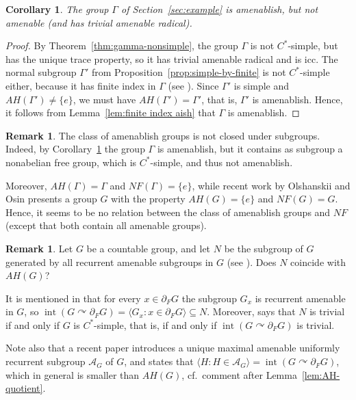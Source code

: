 \documentclass[a4paper]{amsart}
\theoremstyle{plain}
\newtheorem{corollary}[theorem]{Corollary}
\theoremstyle{definition}
\newtheorem{remark}[theorem]{Remark}
\theoremstyle{remark}
\numberwithin{theorem}{section}
\begin{document}
\begin{corollary}\label{cor:gamma-amenablish}
The group $\Gamma$ of Section~\ref{sec:example} is amenablish, but not amenable (and has trivial amenable radical).
\end{corollary}

\begin{proof}
By Theorem~\ref{thm:gamma-nonsimple}, the group $\Gamma$ is not $C^*$-simple, but has the unique trace property,
so it has trivial amenable radical and is icc.
The normal subgroup $\Gamma'$ from Proposition~\ref{prop:simple-by-finite} is not $C^*$-simple either,
because it has finite index in $\Gamma$ (see \cite[Proposition~19~(iv)]{Harpe2}).
Since $\Gamma'$ is simple and $AH(\Gamma')\neq\{e\}$, we must have $AH(\Gamma')=\Gamma'$, that is, $\Gamma'$ is amenablish.
Hence, it follows from Lemma~\ref{lem:finite index aish} that $\Gamma$ is amenablish.
\end{proof}

\begin{remark}
The class of amenablish groups is not closed under subgroups.
Indeed, by Corollary~\ref{cor:gamma-amenablish} the group $\Gamma$ is amenablish,
but it contains as subgroup a nonabelian free group, which is $C^*$-simple, and thus not amenablish.

Moreover, $AH(\Gamma)=\Gamma$ and $NF(\Gamma)=\{e\}$,
while recent work by Olshanskii and Osin \cite{O-O} presents a group $G$ with the property $AH(G)=\{e\}$ and $NF(G)=G$.
Hence, it seems to be no relation between the class of amenablish groups and $NF$ (except that both contain all amenable groups).
\end{remark}

\begin{remark}\label{AG}
Let $G$ be a countable group, and let $N$ be the subgroup of $G$ generated by all recurrent amenable subgroups in $G$ (see \cite[Definition~5.1]{Kennedy}). Does $N$ coincide with $AH(G)$?

It is mentioned in \cite[Remark~5.4]{Kennedy} that for every $x\in\partial_F G$ the subgroup $G_x$ is recurrent amenable in $G$,
so $\operatorname{int}(G\curvearrowright\partial_F G)=\langle G_x : x\in\partial_F G\rangle\subseteq N$.
Moreover, \cite[Theorem~1.1]{Kennedy} says that $N$ is trivial if and only if $G$ is $C^*$-simple,
that is, if and only if $\operatorname{int}(G\curvearrowright\partial_F G)$ is trivial.

Note also that a recent paper \cite[Section~4]{Boudec-Bon} introduces a unique maximal amenable uniformly recurrent subgroup $\mathcal{A}_G$ of $G$,
and \cite[Proposition~2.21~(ii)]{Boudec-Bon} states that $\langle H:H\in\mathcal{A}_G\rangle=\operatorname{int}(G\curvearrowright\partial_F G)$,
which in general is smaller than $AH(G)$, cf.\ comment after Lemma~\ref{lem:AH-quotient}.

\end{remark}
\end{document}
